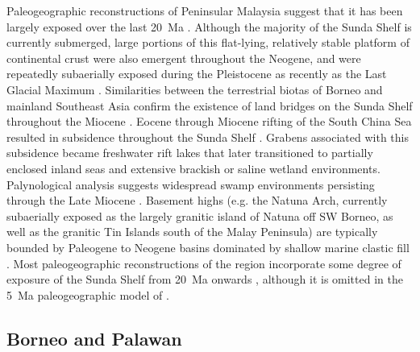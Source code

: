 \documentclass[11pt,letterpaper]{article}
\begin{document}
Paleogeographic reconstructions of Peninsular Malaysia suggest that it has been largely exposed over the last 20~Ma \citep{Hall2002a, Hall2013b}. Although the majority of the Sunda Shelf is currently submerged, large portions of this flat-lying, relatively stable platform of continental crust were also emergent throughout the Neogene, and were repeatedly subaerially exposed during the Pleistocene as recently as the Last Glacial Maximum \citep{Hall2002a}. Similarities between the terrestrial biotas of Borneo and mainland Southeast Asia confirm the existence of land bridges on the Sunda Shelf throughout the Miocene \citep{Moss1998a}. Eocene through Miocene rifting of the South China Sea resulted in subsidence throughout the Sunda Shelf \citep{Morley2013a}. Grabens associated with this subsidence became freshwater rift lakes that later transitioned to partially enclosed inland seas and extensive brackish or saline wetland environments. Palynological analysis suggests widespread swamp environments persisting through the Late Miocene \citep{Morley2013a}. Basement highs (e.g. the Natuna Arch, currently subaerially exposed as the largely granitic island of Natuna off SW Borneo, as well as the granitic Tin Islands south of the Malay Peninsula) are typically bounded by Paleogene to Neogene basins dominated by shallow marine clastic fill \citep{Darmadi2007a}. Most paleogeographic reconstructions of the region incorporate some degree of exposure of the Sunda Shelf from 20~Ma onwards \citep{Hall2013b, Madon2013a}, although it is omitted in the 5~Ma paleogeographic model of \citet{Molnar2015a}.

\subsection*{Borneo and Palawan}
\end{document}
